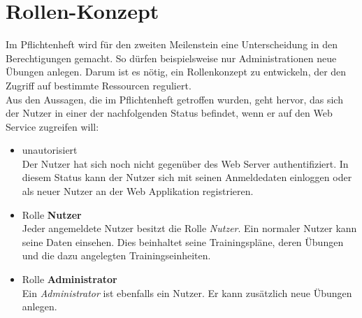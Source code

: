 \section{Rollen-Konzept}
\label{sec:rollen-konzept}
Im Pflichtenheft wird für den zweiten Meilenstein eine Unterscheidung in den Berechtigungen gemacht. So dürfen beispielsweise nur Administrationen neue Übungen anlegen. Darum ist es nötig, ein Rollenkonzept zu entwickeln, der den Zugriff auf bestimmte Ressourcen reguliert. \\
Aus den Aussagen, die im Pflichtenheft getroffen wurden, geht hervor, das sich der Nutzer in einer der nachfolgenden Status befindet, wenn er auf den Web Service zugreifen will: 
\begin{itemize}
\item unautorisiert \\
Der Nutzer hat sich noch nicht gegenüber des Web Server authentifiziert. In diesem Status kann der Nutzer sich mit seinen Anmeldedaten einloggen oder als neuer Nutzer an der Web Applikation registrieren.
\item Rolle \textbf{Nutzer}\\
Jeder angemeldete Nutzer besitzt die Rolle \textit{Nutzer}. Ein normaler Nutzer kann seine Daten einsehen. Dies beinhaltet seine Trainingspläne, deren Übungen und die dazu angelegten Trainingseinheiten.
\item Rolle \textbf{Administrator}\\
Ein \textit{Administrator} ist ebenfalls ein Nutzer. Er kann zusätzlich neue Übungen anlegen. 
\end{itemize}